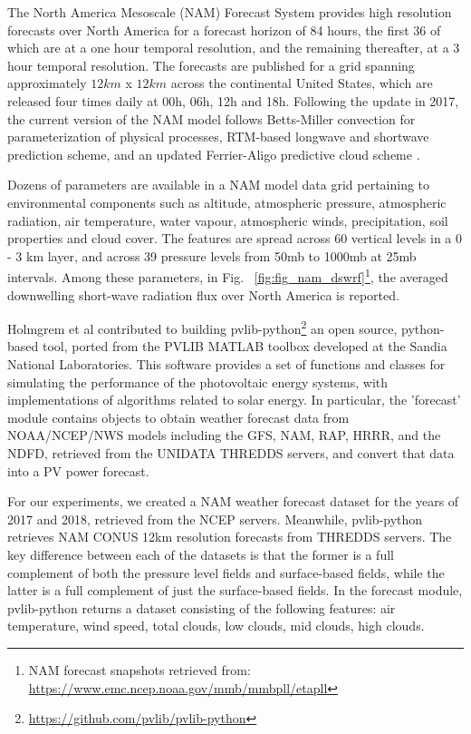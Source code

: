 \par The North America Mesoscale (NAM) Forecast System provides high resolution forecasts over North America for a forecast horizon of 84 hours, the first 36 of which are at a one hour temporal resolution, and the remaining thereafter, at a 3 hour temporal resolution. The forecasts are published for a grid spanning approximately $12km$ x $12 km$ across the continental United States, which are released four times daily at 00h, 06h, 12h and 18h. Following the update in 2017, the current version of the NAM model follows Betts-Miller convection for parameterization of physical processes, RTM-based longwave and shortwave prediction scheme, and an updated Ferrier-Aligo predictive cloud scheme \cite{multimodel_cloud}.

\par Dozens of parameters are available in a NAM model data grid pertaining to environmental components such as altitude, atmospheric pressure, atmospheric radiation, air temperature, water vapour, atmospheric winds, precipitation, soil properties and cloud cover. The features are spread across 60 vertical levels in a 0 - 3 km layer, and across 39 pressure levels from 50mb to 1000mb at 25mb intervals. Among these parameters, in Fig. ~\ref{fig:fig_nam_dswrf}\footnote{NAM forecast snapshots retrieved from: \url{https://www.emc.ncep.noaa.gov/mmb/mmbpll/etapll}}, the averaged downwelling short-wave radiation flux over North America is reported.

Holmgrem et al \cite{pvlib_Holmgren2018} contributed to building pvlib-python\footnote{\url{https://github.com/pvlib/pvlib-python}} an open source, python-based tool, ported from the PVLIB MATLAB toolbox developed at the Sandia National Laboratories. This software provides a set of functions and classes for simulating the performance of the photovoltaic energy systems, with implementations of algorithms related to solar energy. In particular, the 'forecast' module contains objects to obtain weather forecast data from NOAA/NCEP/NWS models including the GFS, NAM, RAP, HRRR, and the NDFD, retrieved from the UNIDATA THREDDS servers, and convert that data into a PV power forecast. 

\par For our experiments, we created a NAM weather forecast dataset for the years of 2017 and 2018, retrieved from the NCEP servers. Meanwhile, pvlib-python retrieves NAM CONUS 12km resolution forecasts from THREDDS servers. The key difference between each of the datasets is that the former is a full complement of both the pressure level fields and surface-based fields, while the latter is a full complement of just the surface-based fields. In the forecast module, pvlib-python returns a dataset consisting of the following features: air temperature, wind speed, total clouds, low clouds, mid clouds, high clouds. 

